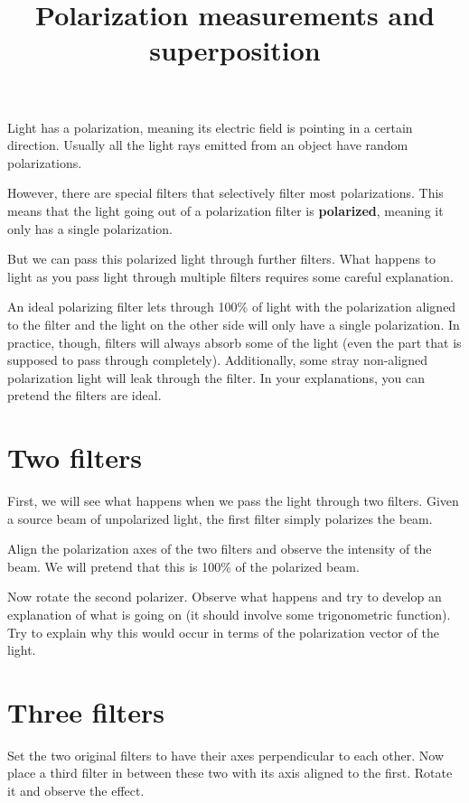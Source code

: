 \documentclass[phy1200]{handout}
\title{Polarization measurements and \\superposition}
\begin{document}
\maketitle

Light has a polarization, meaning its electric field is pointing in a certain direction. Usually all the light rays emitted from an object have random polarizations.

However, there are special filters that selectively filter most polarizations. This means that the light going out of a polarization filter is \textbf{polarized}, meaning it only has a single polarization. 

But we can pass this polarized light through further filters. What happens to light as you pass light through multiple filters requires some careful explanation.

An ideal polarizing filter lets through 100\% of light with the polarization aligned to the filter and the light on the other side will only have a single polarization. In practice, though, filters will always absorb some of the light (even the part that is supposed to pass through completely). Additionally, some stray non-aligned polarization light will leak through the filter. In your explanations, you can pretend the filters are ideal.

\section{Two filters}
First, we will see what happens when we pass the light through two filters. Given a source beam of unpolarized light, the first filter simply polarizes the beam. 

Align the polarization axes of the two filters and observe the intensity of the beam. We will pretend that this is 100\% of the polarized beam.

Now rotate the second polarizer. Observe what happens and try to develop an explanation of what is going on (it should involve some trigonometric function). Try to explain why this would occur in terms of the polarization vector of the light.

\section{Three filters}
Set the two original filters to have their axes perpendicular to each other. Now place a third filter in between these two with its axis aligned to the first. Rotate it and observe the effect. 
\end{document}
